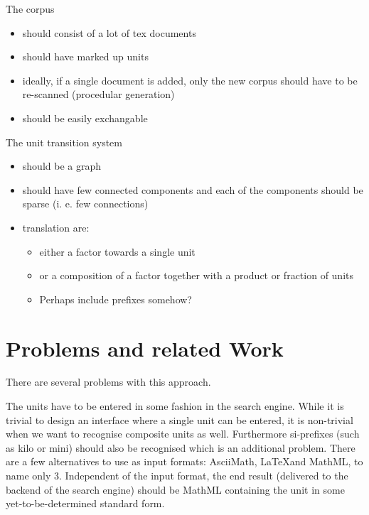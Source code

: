 \documentclass[11pt]{article}
\begin{document}
\noindent The corpus 
\begin{itemize}
  \item should consist of a lot of tex documents
  \item should have marked up units
  \item ideally, if a single document is added, only the new corpus should have to be re-scanned (procedular generation)
  \item should be easily exchangable
\end{itemize}

The unit transition system 
\begin{itemize}
  \item should be a graph
  \item should have few connected components and each of the components should be sparse (i. e. few connections)
  \item translation are:
  \begin{itemize}
    \item either a factor towards a single unit
    \item or a composition of a factor together with a product or fraction of units 
    \item Perhaps include prefixes somehow?
  \end{itemize}
\end{itemize}

\section{Problems and related Work}
\label{sec:problems_relatedwork}

There are several problems with this approach. 

The units have to be entered in some fashion in the search engine. While it is trivial to design an interface where a single unit can be entered, it is non-trivial when we want to recognise composite units as well. Furthermore si-prefixes (such as kilo or mini) should also be recognised which is an additional problem. There are a few alternatives to use as input formats: AsciiMath, \LaTeX and MathML, to name only 3. Independent of the input format, the end result (delivered to the backend of the search engine) should be MathML containing the unit in some yet-to-be-determined standard form.
\end{document}
